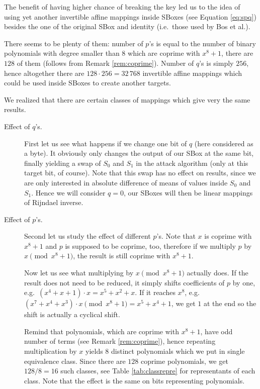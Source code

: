 The benefit of having higher chance of breaking the key led us to the idea of using yet another invertible affine mappings inside SBoxes (see Equation \ref{eq:spq}) besides the one of the original SBox and identity (i.e.\ those used by Bos et al.).

\newpage   %

There seems to be plenty of them: number of $p$'s is equal to the number of binary polynomials with degree smaller than $8$ which are coprime with $x^8+1$, there are $128$ of them (follows from Remark \ref{rem:coprime}). Number of $q$'s is simply $256$, hence altogether there are $128\cdot 256 = 32\,768$ invertible affine mappings which could be used inside SBoxes to create another targets.

\begin{remark}
\label{rem:pqeffect}
	We realized that there are certain classes of mappings which give very the same results.
	\begin{description}
		\item[Effect of $q$'s.]
			First let us see what happens if we change one bit of $q$ (here considered as a byte). It obviously only changes the output of our SBox at the same bit, finally yielding a swap of $S_0$ and $S_1$ in the attack algorithm (only at this target bit, of course). Note that this swap has no effect on results, since we are only interested in absolute difference of means of values inside $S_0$ and $S_1$. Hence we will consider $q = 0$, our SBoxes will then be linear mappings of Rijndael inverse.
		
		\item[Effect of $p$'s.]
			Second let us study the effect of different $p$'s. Note that $x$ is coprime with $x^8+1$ and $p$ is supposed to be coprime, too, therefore if we multiply $p$ by $x\pmod{x^8+1}$, the result is still coprime with $x^8+1$.
			
			Now let us see what multiplying by $x\pmod{x^8+1}$ actually does. If the result does not need to be reduced, it simply shifts coefficients of $p$ by one, e.g.\ $(x^4 + x + 1) \cdot x = x^5 + x^2 + x$. If it reaches $x^8$, e.g.\ $(x^7 + x^4 + x^3) \cdot x \pmod{x^8+1} = x^5 + x^4 + 1$, we get $1$ at the end so the shift is actually a cyclical shift.
			
			Remind that polynomials, which are coprime with $x^8+1$, have odd number of terms (see Remark \ref{rem:coprime}), hence repeating multiplication by $x$ yields $8$ distinct polynomials which we put in single equivalence class. Since there are $128$ coprime polynomials, we get $128/8=16$ such classes, see Table \ref{tab:classrepre} for representants of each class. Note that the effect is the same on bits representing polynomials.
			

\end{description}
\end{remark}
